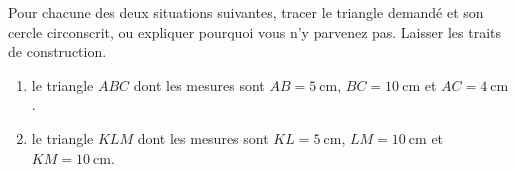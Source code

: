 
\begin{exercice}\label{exo2smath-0004}

    Pour chacune des deux situations suivantes, tracer le triangle demandé et son cercle circonscrit, ou expliquer pourquoi vous n'y parvenez pas. Laisser les traits de construction.
    \begin{enumerate}
        \item
            le triangle \( ABC\) dont les mesures sont \( AB=\SI{5}{\centi\meter}\), \( BC=\SI{10}{\centi\meter}\) et \( AC=\SI{4}{\centi\meter}\).
        \item
            le triangle \( KLM\) dont les mesures sont \( KL=\SI{5}{\centi\meter}\), \( LM=\SI{10}{\centi\meter}\) et \( KM=\SI{10}{\centi\meter}\).
    \end{enumerate}


\end{exercice}
